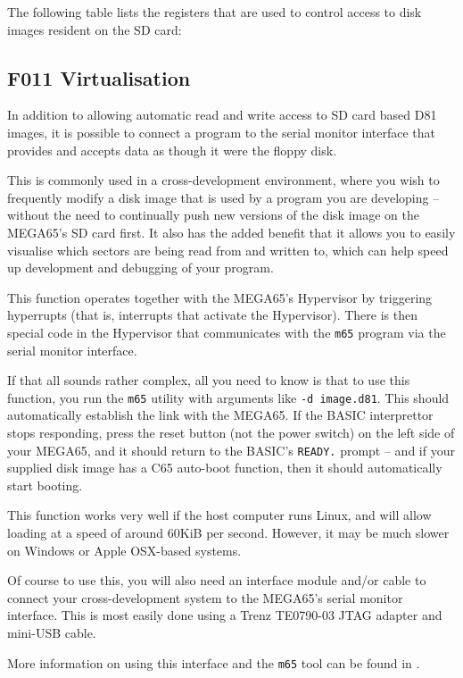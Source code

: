 The following table lists the registers that are used to control
access to disk images resident on the SD card:



\subsection{F011 Virtualisation}

In addition to allowing automatic read and write access to SD card
based D81 images, it is possible to connect a program to the serial
monitor interface that provides and accepts data as though it were the
floppy disk.

This is commonly used in a cross-development
environment, where you wish to frequently modify a disk image that is
used by a program you are developing -- without the need to
continually push new versions of the disk image on the MEGA65's
SD card first. It also has the added benefit that it allows you to
easily visualise which sectors are being read from and written to,
which can help speed up development and debugging of your program.

This function operates together with the MEGA65's Hypervisor by
triggering hyperrupts (that is, interrupts that activate the
Hypervisor).  There is then special code in the Hypervisor that
communicates with the {\tt m65} program via the serial monitor
interface.

If that all sounds rather complex, all you need to know is that to use
this function, you run the {\tt m65} utility with arguments like
{\tt -d image.d81}.  This should automatically establish the link with
the MEGA65.  If the BASIC interprettor stops responding, press the
reset button (not the power switch) on the left side of your MEGA65,
and it should return to the BASIC's {\tt READY.} prompt -- and if your
supplied disk image has a C65 auto-boot function, then it should
automatically start booting.

This function works very well if the host computer runs Linux, and
will allow loading at a speed of around 60KiB per second.  However, it
may be much slower on Windows or Apple OSX-based systems.

Of course to use this, you will also need an interface module and/or
cable to connect your cross-development system to the MEGA65's serial
monitor interface. This is most easily done using a Trenz TE0790-03
JTAG adapter and mini-USB cable.

More information on using this interface and the {\tt m65} tool can be
found in .

